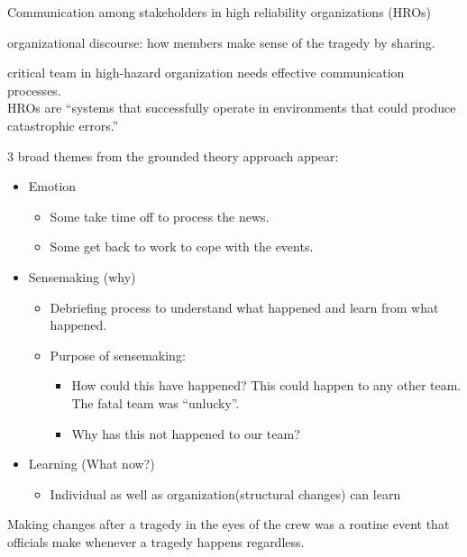 \documentclass[
]{book}
\providecommand{\tightlist}{%
  \setlength{\itemsep}{0pt}\setlength{\parskip}{0pt}}
\begin{document}
\citep{Williams_2017}

Communication among stakeholders in high reliability organizations (HROs)

organizational discourse: how members make sense of the tragedy by sharing.

critical team in high-hazard organization needs effective communication processes.\\
HROs are ``systems that successfully operate in environments that could produce catastrophic errors.''

3 broad themes from the grounded theory approach appear:

\begin{itemize}
\item
  Emotion

  \begin{itemize}
  \tightlist
  \item
    Some take time off to process the news.
  \item
    Some get back to work to cope with the events.
  \end{itemize}
\item
  Sensemaking (why)

  \begin{itemize}
  \item
    Debriefing process to understand what happened and learn from what happened.
  \item
    Purpose of sensemaking:

    \begin{itemize}
    \tightlist
    \item
      How could this have happened? This could happen to any other team. The fatal team was ``unlucky''.
    \item
      Why has this not happened to our team?
    \end{itemize}
  \end{itemize}
\item
  Learning (What now?)

  \begin{itemize}
  \tightlist
  \item
    Individual as well as organization(structural changes) can learn
  \end{itemize}
\end{itemize}

Making changes after a tragedy in the eyes of the crew was a routine event that officials make whenever a tragedy
happens regardless.
\end{document}
